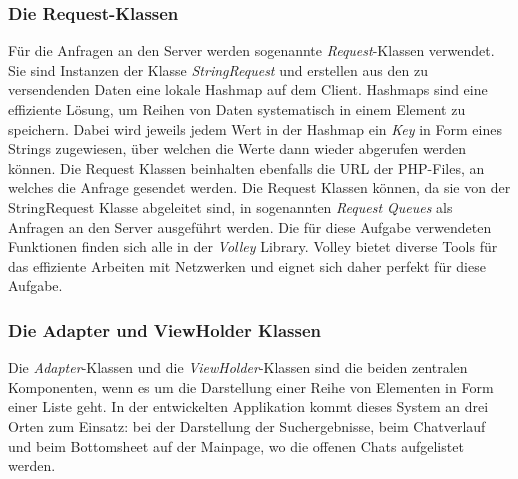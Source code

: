 \documentclass[a4paper,11pt]{report}
\begin{document}
				\subsubsection{Die Request-Klassen}
				Für die Anfragen an den Server werden sogenannte \emph{Request}-Klassen verwendet. Sie sind Instanzen der Klasse \emph{StringRequest} und erstellen aus den zu versendenden Daten eine lokale Hashmap auf dem Client. Hashmaps sind eine effiziente Lösung, um Reihen von Daten systematisch in einem Element zu speichern. Dabei wird jeweils jedem Wert in der Hashmap ein \emph{Key} in Form eines Strings zugewiesen, über welchen die Werte dann wieder abgerufen werden können. Die Request Klassen beinhalten ebenfalls die URL der PHP-Files, an welches die Anfrage gesendet werden. Die Request Klassen können, da sie von der StringRequest Klasse abgeleitet sind, in sogenannten \emph{Request Queues} als Anfragen an den Server ausgeführt werden. Die für diese Aufgabe verwendeten Funktionen finden sich alle in der \emph{Volley} Library. Volley bietet diverse Tools für das effiziente Arbeiten mit Netzwerken und eignet sich daher perfekt für diese Aufgabe.\cite{volley}
				\subsubsection{Die Adapter und ViewHolder Klassen}\label{adapter}
				Die \emph{Adapter}-Klassen und die \emph{ViewHolder}-Klassen sind die beiden zentralen Komponenten, wenn es um die Darstellung einer Reihe von Elementen in Form einer Liste geht. In der entwickelten Applikation kommt dieses System an drei Orten zum Einsatz: bei der Darstellung der Suchergebnisse, beim Chatverlauf und beim Bottomsheet auf der Mainpage, wo die offenen Chats aufgelistet werden.
				
\end{document}
